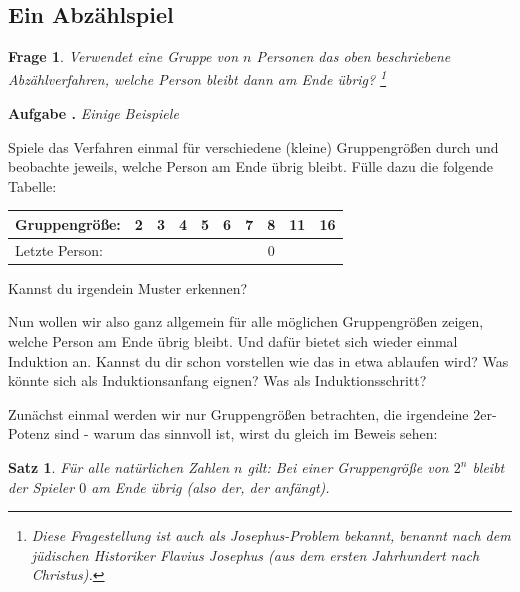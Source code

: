 \documentclass[a4paper,ngerman,12pt]{scrartcl}
\theoremstyle{definition}
\theoremstyle{plain}
\newtheorem{satz}[defn]{Satz}
\newtheorem{frage}[defn]{Frage}
\theoremstyle{remark}
\newlength{\aufgabenskip}
\newcounter{aufgabennummer}
\newenvironment{aufgabe}[1]{
	\refstepcounter{aufgabennummer}
	\textbf{Aufgabe \theaufgabennummer.} \emph{#1} \par
}{\vspace{\aufgabenskip}}
\begin{document}

\subsection{Ein Abzählspiel}



\begin{frage}
	Verwendet eine Gruppe von $n$ Personen das oben beschriebene Abzählverfahren, welche Person bleibt dann am Ende übrig?
	\footnote{Diese Fragestellung ist auch als Josephus-Problem bekannt, benannt nach dem jüdischen Historiker Flavius Josephus (aus dem ersten Jahrhundert nach Christus).}
\end{frage}

\begin{aufgabe}{Einige Beispiele}\label{aufgabe:JosephusBspe}
	Spiele das Verfahren einmal für verschiedene (kleine) Gruppengrößen durch und beobachte jeweils, welche Person am Ende übrig bleibt. Fülle dazu die folgende Tabelle:
	\begin{center}
		\renewcommand{\arraystretch}{2}\setlength{\tabcolsep}{1em}
		\begin{tabular}{l||c|c|c|c|c|c|c|c|c}
			Gruppengröße:	& 2	& 3 & 4 & 5 & 6 & 7 & 8 & 11 & 16 \\\hline
			Letzte Person:	&   &   &   &   &   &   & 0 &    &    
		\end{tabular}
	\end{center}
	Kannst du irgendein Muster erkennen? 
\end{aufgabe}

Nun wollen wir also ganz allgemein für alle möglichen Gruppengrößen zeigen, welche Person am Ende übrig bleibt. Und dafür bietet sich wieder einmal Induktion an. Kannst du dir schon vorstellen wie das in etwa ablaufen wird? Was könnte sich als Induktionsanfang eignen? Was als Induktionsschritt?

Zunächst einmal werden wir nur Gruppengrößen betrachten, die irgendeine $2$er-Potenz sind - warum das sinnvoll ist, wirst du gleich im Beweis sehen:

\begin{satz}\label{satz:Josephus1}
	Für alle natürlichen Zahlen $n$ gilt: Bei einer Gruppengröße von $2^n$ bleibt der Spieler $0$ am Ende übrig (also der, der anfängt).
\end{satz}
\end{document}
